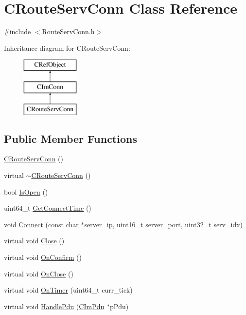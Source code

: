 \hypertarget{class_c_route_serv_conn}{}\section{C\+Route\+Serv\+Conn Class Reference}
\label{class_c_route_serv_conn}


{\ttfamily \#include $<$Route\+Serv\+Conn.\+h$>$}

Inheritance diagram for C\+Route\+Serv\+Conn\+:\begin{figure}[H]
\begin{center}
\leavevmode
\includegraphics[height=3.000000cm]{class_c_route_serv_conn}
\end{center}
\end{figure}
\subsection*{Public Member Functions}
\begin{DoxyCompactItemize}
\item 
\hyperlink{class_c_route_serv_conn_afa0d4a12167bc1f33807203453c77402}{C\+Route\+Serv\+Conn} ()
\item 
virtual \hyperlink{class_c_route_serv_conn_a3a09c3160bfc93b1dcd90c6a25426026}{$\sim$\+C\+Route\+Serv\+Conn} ()
\item 
bool \hyperlink{class_c_route_serv_conn_a03ead86a07973aefb09fa53151248435}{Is\+Open} ()
\item 
uint64\+\_\+t \hyperlink{class_c_route_serv_conn_a5ab669ba352ed1c4b3dbcb3d563041c1}{Get\+Connect\+Time} ()
\item 
void \hyperlink{class_c_route_serv_conn_a93c15ae50a1120fbfbccab31dbf6c551}{Connect} (const char $\ast$server\+\_\+ip, uint16\+\_\+t server\+\_\+port, uint32\+\_\+t serv\+\_\+idx)
\item 
virtual void \hyperlink{class_c_route_serv_conn_adba2951266733539c6be2ea2f14ce918}{Close} ()
\item 
virtual void \hyperlink{class_c_route_serv_conn_a23ec68830e9a0828be41e3db58952bf1}{On\+Confirm} ()
\item 
virtual void \hyperlink{class_c_route_serv_conn_ae880b5a1e17167ce31c5242f0121f133}{On\+Close} ()
\item 
virtual void \hyperlink{class_c_route_serv_conn_a17876c954fa36164e3a4a3debb9dff8f}{On\+Timer} (uint64\+\_\+t curr\+\_\+tick)
\item 
virtual void \hyperlink{class_c_route_serv_conn_a898c58ee81e46283a1172acdbc14df81}{Handle\+Pdu} (\hyperlink{class_c_im_pdu}{C\+Im\+Pdu} $\ast$p\+Pdu)
\end{DoxyCompactItemize}
